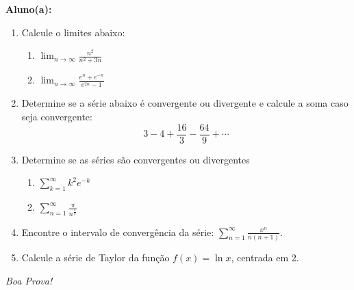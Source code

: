 \documentclass[a4paper,5pt]{amsbook}
\newcommand{\ds}{\displaystyle}
\begin{document}
\vspace{0.5cm}
{\bf Aluno(a):}\dotfill{}  %

\vspace{0.2cm}
\begin{enumerate}
	\vspace{0.5cm}
	\item Calcule o limites abaixo:
		\begin{enumerate}
			\item $\ds\lim_{n\rightarrow\infty}\frac{n^2}{n^2+3n}$
			\vspace{0.3cm}
			\item $\ds\lim_{n\rightarrow\infty}\frac{e^n+e^{-n}}{e^{2n}-1}$
		\end{enumerate}

	\vspace{0.5cm}
	\item Determine se a s\'erie abaixo \'e convergente ou divergente e calcule a soma
		caso seja convergente:
		$$\ds3-4+\frac{16}{3}-\frac{64}{9}+\cdots$$

	\vspace{0.5cm}
	\item Determine se as s\'eries s\~ao convergentes ou divergentes
		\begin{enumerate}
			\item $\ds\sum_{k=1}^\infty k^2 e^{-k}$
			\vspace{0.3cm}
			\item $\ds\sum_{n=1}^\infty \frac{\pi}{n^{{\frac{1}{\pi}}}}$
		\end{enumerate}

	\vspace{0.5cm}
	\item Encontre o intervalo de converg\^encia da s\'erie: $\ds \sum_{n=1}^\infty
		\frac{x^n}{n(n+1)}$.

	\vspace{0.5cm}
	\item Calcule a s\'erie de Taylor da fun\c{c}\~ao $f(x) = \ln{x}$, centrada em $2$.
\end{enumerate}

\vspace{1cm}
\begin{flushright}
	\textit{Boa Prova!}
\end{flushright}
\end{document}
